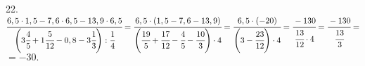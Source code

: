 22. $\cfrac{6,5\cdot1,5-7,6\cdot6,5-13,9\cdot6,5}{\left(3\cfrac{4}{5}+1\cfrac{5}{12}-0,8-3\cfrac{1}{3}\right):\cfrac{1}{4}}=
\cfrac{6,5\cdot(1,5-7,6-13,9)}{\left(\cfrac{19}{5}+\cfrac{17}{12}-\cfrac{4}{5}-\cfrac{10}{3}\right)\cdot4}=
\cfrac{6,5\cdot(-20)}{\left(3-\cfrac{23}{12}\right)\cdot4}=\cfrac{-130}{\cfrac{13}{12}\cdot4}=\cfrac{-130}{\cfrac{13}{3}}=$\\$=-30.$\\
